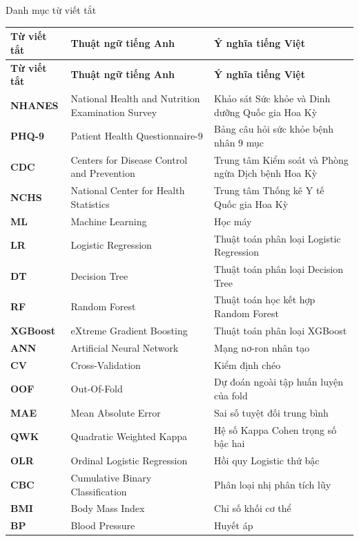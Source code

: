 \documentclass{uetgraduation}
\begin{document}
\begin{contentlisting}
\begin{contentlistingsection}{Danh mục từ viết tắt}
\setlength{\tabcolsep}{4pt}
\begin{longtable}{p{2.0cm} p{6.4cm} p{6.4cm}}
\toprule
\textbf{Từ viết tắt} & \textbf{Thuật ngữ tiếng Anh} & \textbf{Ý nghĩa tiếng Việt} \\
\midrule
\endfirsthead
\toprule
\textbf{Từ viết tắt} & \textbf{Thuật ngữ tiếng Anh} & \textbf{Ý nghĩa tiếng Việt} \\
\midrule
\endhead
\bottomrule
\endfoot
\textbf{NHANES} & National Health and Nutrition Examination Survey & Khảo sát Sức khỏe và Dinh dưỡng Quốc gia Hoa Kỳ \\
\textbf{PHQ-9}  & Patient Health Questionnaire-9 & Bảng câu hỏi sức khỏe bệnh nhân 9 mục \\
\textbf{CDC}    & Centers for Disease Control and Prevention & Trung tâm Kiểm soát và Phòng ngừa Dịch bệnh Hoa Kỳ \\
\textbf{NCHS}   & National Center for Health Statistics & Trung tâm Thống kê Y tế Quốc gia Hoa Kỳ \\
\textbf{ML}     & Machine Learning & Học máy \\
\textbf{LR}     & Logistic Regression & Thuật toán phân loại Logistic Regression \\
\textbf{DT}     & Decision Tree & Thuật toán phân loại Decision Tree \\
\textbf{RF}     & Random Forest & Thuật toán học kết hợp Random Forest \\
\textbf{XGBoost}& eXtreme Gradient Boosting & Thuật toán phân loại XGBoost \\
\textbf{ANN}    & Artificial Neural Network & Mạng nơ-ron nhân tạo \\
\textbf{CV}     & Cross-Validation & Kiểm định chéo \\
\textbf{OOF}    & Out-Of-Fold & Dự đoán ngoài tập huấn luyện của fold \\
\textbf{MAE}    & Mean Absolute Error & Sai số tuyệt đối trung bình \\
\textbf{QWK}    & Quadratic Weighted Kappa & Hệ số Kappa Cohen trọng số bậc hai \\
\textbf{OLR}    & Ordinal Logistic Regression & Hồi quy Logistic thứ bậc \\
\textbf{CBC}    & Cumulative Binary Classification & Phân loại nhị phân tích lũy \\
\textbf{BMI}    & Body Mass Index & Chỉ số khối cơ thể \\
\textbf{BP}     & Blood Pressure & Huyết áp \\

\end{longtable}
\end{contentlistingsection}
\end{contentlisting}
\end{document}
